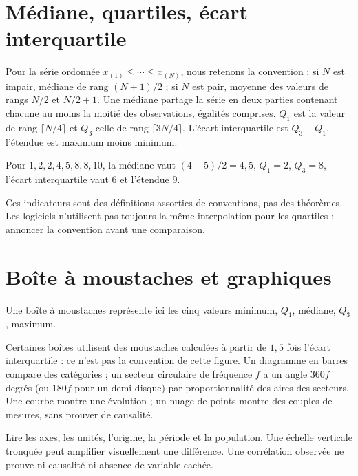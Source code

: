 \documentclass[../cours_2de.tex]{subfiles}
\begin{document}
\section{Médiane, quartiles, écart interquartile}
Pour la série ordonnée $x_{(1)}\leq\cdots\leq x_{(N)}$, nous retenons la convention :
si $N$ est impair, médiane de rang $(N+1)/2$ ; si $N$ est pair, moyenne des valeurs de rangs $N/2$ et $N/2+1$.
Une médiane partage la série en deux parties contenant chacune au moins la moitié des observations, égalités comprises.
$Q_1$ est la valeur de rang $\lceil N/4\rceil$ et $Q_3$ celle de rang $\lceil3N/4\rceil$.
L'écart interquartile est $Q_3-Q_1$, l'étendue est maximum moins minimum.
\begin{exemple}
Pour $1,2,2,4,5,8,8,10$, la médiane vaut $(4+5)/2=4{,}5$,
$Q_1=2$, $Q_3=8$, l'écart interquartile vaut $6$ et l'étendue $9$.
\end{exemple}
Ces indicateurs sont des définitions assorties de conventions, pas des théorèmes.
Les logiciels n'utilisent pas toujours la même interpolation pour les quartiles ; annoncer la convention avant une comparaison.
\section{Boîte à moustaches et graphiques}
Une boîte à moustaches représente ici les cinq valeurs minimum, $Q_1$, médiane, $Q_3$, maximum.
\begin{center}
\end{center}
Certaines boîtes utilisent des moustaches calculées à partir de $1{,}5$ fois l'écart interquartile : ce n'est pas la convention de cette figure.
Un diagramme en barres compare des catégories ; un secteur circulaire de fréquence $f$ a un angle $360f$ degrés (ou $180f$ pour un demi-disque) par proportionnalité des aires des secteurs.
Une courbe montre une évolution ; un nuage de points montre des couples de mesures, sans prouver de causalité.
\begin{attention}
Lire les axes, les unités, l'origine, la période et la population.
Une échelle verticale tronquée peut amplifier visuellement une différence.
Une corrélation observée ne prouve ni causalité ni absence de variable cachée.
\end{attention}
\end{document}
